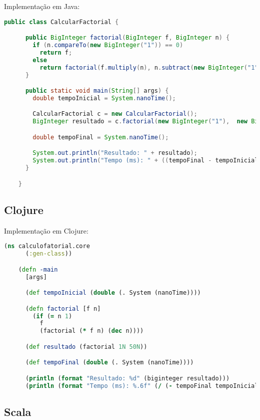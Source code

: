     Implementação em Java:

    \begin{lstlisting}[language=Java, mathescape=false]
    public class CalcularFactorial {

      public BigInteger factorial(BigInteger f, BigInteger n) {
        if (n.compareTo(new BigInteger("1")) == 0)
          return f;
        else
          return factorial(f.multiply(n), n.subtract(new BigInteger("1")));
      }

      public static void main(String[] args) {
        double tempoInicial = System.nanoTime();

        CalcularFactorial c = new CalcularFactorial();
        BigInteger resultado = c.factorial(new BigInteger("1"),  new BigInteger("50"));

        double tempoFinal = System.nanoTime();

        System.out.println("Resultado: " + resultado);
        System.out.println("Tempo (ms): " + ((tempoFinal - tempoInicial) / 1000000));
      }

    }
    \end{lstlisting}

  \subsection{Clojure}

    Implementação em Clojure:

    \begin{lstlisting}[language=Clojure, mathescape=false]
    (ns calculofatorial.core
      (:gen-class))

    (defn -main
      [args]

      (def tempoInicial (double (. System (nanoTime))))

      (defn factorial [f n]
        (if (= n 1)
          f
          (factorial (* f n) (dec n))))

      (def resultado (factorial 1N 50N))

      (def tempoFinal (double (. System (nanoTime))))

      (println (format "Resultado: %d" (biginteger resultado)))
      (println (format "Tempo (ms): %.6f" (/ (- tempoFinal tempoInicial) 1000000))))
    \end{lstlisting}

  \subsection{Scala}

